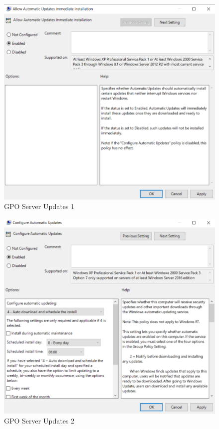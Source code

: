 \begin{minipage}{0.5\linewidth}
    \begin{figure}[H]
        \centering
        \includegraphics[width=\linewidth]{../img/Updates/client-allow-immediate-updates.png}
        \caption{GPO Server Updates 1}
    \end{figure}
\end{minipage}
\begin{minipage}{0.5\linewidth}
    \begin{figure}[H]
        \centering
        \includegraphics[width=\linewidth]{../img/Updates/server-configure-automatic-updates.png}
        \caption{GPO Server Updates 2}
    \end{figure}
\end{minipage}\\
